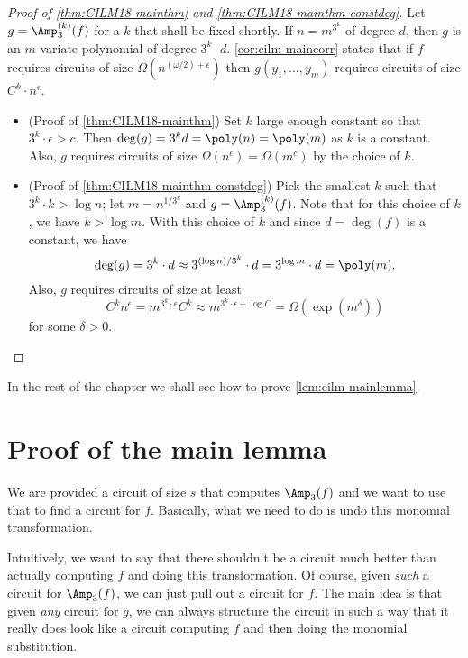 \begin{proof}[Proof of \autoref{thm:CILM18-mainthm} and \autoref{thm:CILM18-mainthm-constdeg}]
  Let $g = \Amp_3^{(k)}(f)$ for a $k$ that shall be fixed shortly. If $n = m^{3^k}$ of degree $d$, then $g$ is an $m$-variate polynomial of degree $3^k \cdot d$. \autoref{cor:cilm-maincorr} states that if $f$ requires circuits of size $\Omega(n^{(\omega/2) + \epsilon})$ then $g(y_1,\ldots, y_m)$ requires circuits of size $C^k \cdot n^\epsilon$.

  \begin{itemize}
  \item (Proof of \autoref{thm:CILM18-mainthm}) Set $k$ large enough constant so that $3^k \cdot \epsilon > c$. Then $\deg(g) = 3^k d = \poly(n) = \poly(m)$ as $k$ is a constant. Also, $g$ requires circuits of size $\Omega(n^\epsilon) = \Omega(m^c)$ by the choice of $k$.

  \item (Proof of \autoref{thm:CILM18-mainthm-constdeg}) Pick the smallest $k$ such that $3^k \cdot k > \log n$; let $m = n^{1/3^k}$ and $g = \Amp_3^{(k)}(f)$.
Note that for this choice of $k$, we have $k > \log m$.
    With this choice of $k$ and since $d = \deg(f)$ is a constant, we have
    \[
      \deg(g) = 3^k \cdot d \approx 3^{(\log n) / 3^k} \cdot d = 3^{\log m} \cdot d = \poly(m).
    \]
    Also, $g$ requires circuits of size at least
    \[
      C^k n^\epsilon = m^{3^k \cdot \epsilon} C^k \approx m^{3^k \cdot \epsilon + \log C}= \Omega(\exp(m^\delta))
    \]
    for some $\delta > 0$. \qedhere
  \end{itemize}
\end{proof}

\noindent
In the rest of the chapter we shall see how to prove \autoref{lem:cilm-mainlemma}.

\section{Proof of the main lemma}

We are provided a circuit of size $s$ that computes $\Amp_3(f)$ and we want to use that to find a circuit for $f$. Basically, what we need to do is undo this monomial transformation.

Intuitively, we want to say that there shouldn't be a circuit much better than actually computing $f$ and doing this transformation. Of course, given \emph{such} a circuit for $\Amp_3(f)$, we can just pull out a circuit for $f$. The main idea is that given \emph{any} circuit for $g$, we can always structure the circuit in such a way that it really does look like a circuit computing $f$ and then doing the monomial substitution.

